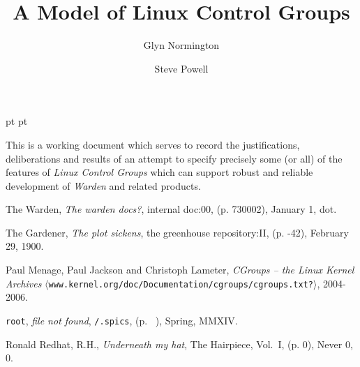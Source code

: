 \documentclass[a4paper,twoside,12pt]{article}
\begin{document}
 pt
 pt

\title{A Model of Linux Control Groups}

\author{
Glyn Normington\and
Steve Powell
}

\maketitle
\thispagestyle{myheadings}
\setcounter{page}{1}


This is a working document which serves to record the justifications, deliberations and results of an attempt to
specify precisely some (or all) of the features of \emph{Linux Control Groups} which can support robust and reliable development of \emph{Warden} and related products.


\newcommand{\true}{true}
\newcommand{\false}{false}
\renewcommand{\emptyset}{\varnothing}

\clearpage
\tableofcontents

\begin{thebibliography}{99}   %


  The Warden,
  \emph{The warden docs?}, 
  internal doc:00, (p. 730002), January 1, dot.

  The Gardener,
  \emph{The plot sickens}, 
  the greenhouse repository:II, (p. -42), February 29, 1900.

  Paul Menage, Paul Jackson and Christoph Lameter,
  \emph{CGroups -- the Linux Kernel Archives}
  $\langle$\texttt{www.kernel.org/doc/Documentation/cgroups/cgroups.txt?}$\rangle$, 2004-2006.

  \texttt{root},
  \emph{file not found}, 
  \texttt{/.spics}, (p. ~), Spring, MMXIV.

  Ronald Redhat, R.H.,
  \emph{Underneath my hat}, 
  The Hairpiece, Vol.~I, (p. 0), Never 0, 0.

\end{thebibliography}
\end{document}
